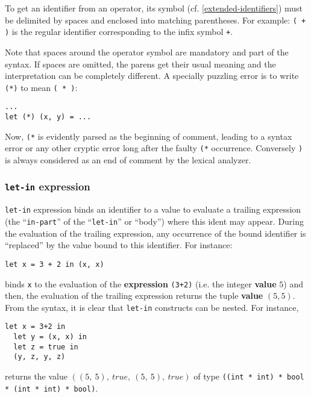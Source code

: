 To get an identifier from an operator, its symbol
(cf. \ref{extended-identifiers}) must be delimited by spaces and enclosed
into matching parentheses.
For example: {\tt (\ + )} is the regular identifier corresponding to the
infix symbol {\tt +}.

Note that spaces around the operator symbol are mandatory and part of the
syntax. If spaces are omitted, the parens get their usual meaning and the
interpretation can be completely different.
A specially puzzling error is to write {\tt (*)} to mean {\tt ( * )}:
{\scriptsize
\begin{lstlisting}
...
let (*) (x, y) = ...
\end{lstlisting}
}
Now, {\tt (*} is evidently parsed as the beginning of comment,
leading to a syntax error or any other cryptic error long after the faulty
{\tt (*} occurrence.
Conversely {\tt *)} is always considered as an end of comment by the lexical
analyzer.




\subsubsection{{\tt let-in} expression}
{\tt let-in} expression binds an identifier to a value to
evaluate a trailing expression (the ``{\tt in-part}'' of the ``{\tt let-in}''
or ``body'') where this ident may appear. During the evaluation of the
trailing expression, any occurrence of the bound identifier is ``replaced''
by the value bound to this identifier. For instance:
{\scriptsize
\begin{lstlisting}
let x = 3 + 2 in (x, x)
\end{lstlisting}
}
 binds {\tt x} to the evaluation of the {\bf expression} {\tt (3+2)}
(i.e. the integer {\bf value} $5$) and then, the evaluation of the
trailing expression returns the tuple {\bf value} $(5, 5)$.  From the
syntax, it is clear that {\tt let-in} constructs can be nested.  For
instance, {\scriptsize
\begin{lstlisting}
let x = 3+2 in
  let y = (x, x) in
  let z = true in
  (y, z, y, z)
\end{lstlisting}
}
returns the value $((5,\ 5),\ true,\ (5,\ 5),\ true)$ of type
{\tt ((int * int) * bool * (int * int) * bool)}.



